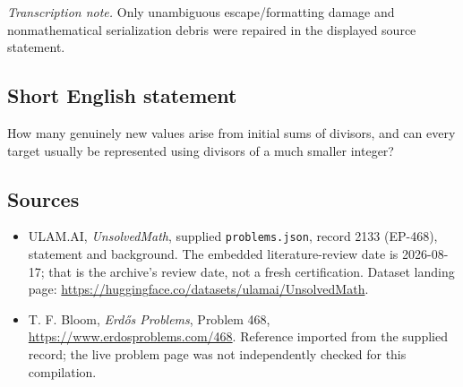 \documentclass[11pt,a4paper]{article}
\begin{document}
{\small\emph{Transcription note.} Only unambiguous escape/formatting damage and nonmathematical serialization debris were repaired in the displayed source statement.}

\subsection{Short English statement}

How many genuinely new values arise from initial sums of divisors, and can every target usually be represented using divisors of a much smaller integer?

\subsection{Sources}

{\small

\begin{itemize}

\item[\hypertarget{source:2133:1}{S1}] ULAM.AI, \emph{UnsolvedMath}, supplied \texttt{problems.json}, record 2133 (EP-468), statement and background. The embedded literature-review date is 2026-08-17; that is the archive’s review date, not a fresh certification. Dataset landing page: \url{https://huggingface.co/datasets/ulamai/UnsolvedMath}.

\item[\hypertarget{source:2133:2}{S2}] T. F. Bloom, \emph{Erdős Problems}, Problem 468, \url{https://www.erdosproblems.com/468}. Reference imported from the supplied record; the live problem page was not independently checked for this compilation.

\end{itemize}

}

\label{end:2133}
\end{document}
